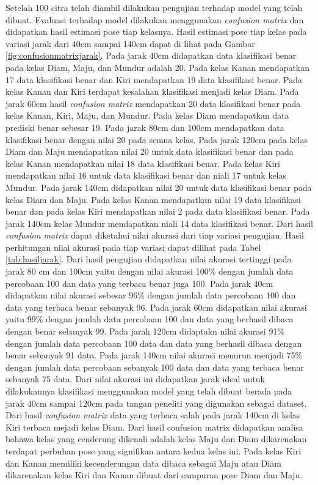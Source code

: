 Setelah 100 citra telah diambil dilakukan pengujian terhadap model yang telah dibuat. Evaluasi terhadap model dilakukan menggunakan \emph{confusion matrix} dan didapatkan hasil estimasi pose tiap kelasnya. Hasil estimasi pose tiap kelas pada variasi jarak dari 40cm sampai 140cm dapat di lihat pada Gambar \ref{fig:confusionmatrixjarak}. Pada jarak 40cm didapatkan data klasifikasi benar pada kelas Diam, Maju, dan Mundur adalah 20. Pada kelas Kanan mendapatkan 17 data klasifikasi benar dan Kiri mendapatkan 19 data klasifikasi benar. Pada kelas Kanan dan Kiri terdapat kesalahan klasifikasi menjadi kelas Diam. Pada jarak 60cm hasil \emph{confusion matrix} mendapatkan 20 data klasifikasi benar pada kelas Kanan, Kiri, Maju, dan Mundur. Pada kelas Diam mendapatkan data prediski benar sebesar 19. Pada jarak 80cm dan 100cm mendapatkan data klasifikasi benar dengan nilai 20 pada semua kelas. Pada jarak 120cm pada kelas Diam dan Maju mendapatkan nilai 20 untuk data klasifikasi benar dan pada kelas Kanan mendapatkan nilai 18 data klasifikasi benar. Pada kelas Kiri mendapatkan nilai 16 untuk data klasifikasi benar dan niali 17 untuk kelas Mundur. Pada jarak 140cm didapatkan nilai 20 untuk data klasifikasi benar pada kelas Diam dan Maju. Pada kelas Kanan mendapatkan nilai 19 data klasifikasi benar dan pada kelas Kiri mendapatkan nilai 2 pada data klasifikasi benar. Pada jarak 140cm kelas Mundur mendapatkan niali 14 data klasifikasi benar. Dari hasil \emph{confusion matrix} dapat diketahui nilai akurasi dari tiap variasi pengujian. Hasil perhitungan nilai akurasi pada tiap variasi dapat dilihat pada Tabel \ref{tab:hasiljarak}. Dari hasil pengujian didapatkan nilai akurasi tertinggi pada jarak 80 cm dan 100cm yaitu dengan nilai akurasi 100\% dengan jumlah data percobaan 100 dan data yang terbaca benar juga 100. Pada jarak 40cm didapatkan nilai akurasi sebesar 96\% dengan jumlah data percobaan 100 dan data yang terbaca benar sebanyak 96. Pada jarak 60cm didapatkan nilai akurasi yaitu 99\% dengan jumlah data percobaan 100 dan data yang berhasil dibaca dengan benar sebanyak 99. Pada jarak 120cm didaptakn nilai akurasi 91\% dengan jumlah data percobaan 100 data dan data yang berhasil dibaca dengan benar sebanyak 91 data. Pada jarak 140cm nilai akurasi menurun menjadi 75\% dengan jumlah data percobaan sebanyak 100 data dan data yang terbaca benar sebanyak 75 data. Dari nilai akurasi ini didapatkan jarak ideal untuk dilakukannya klasifikasi menggunakan model yang telah dibuat berada pada jarak 40cm sampai 120cm pada tangan peneliti yang digunakan sebagai dataset. Dari hasil \emph{confusion matrix} data yang terbaca salah pada jarak 140cm di kelas Kiri terbaca mejadi kelas Diam. Dari hasil confusion matrix didapatkan analisa bahawa kelas yang cenderung dikenali adalah kelas Maju dan Diam dikarenakan terdapat perbuhan pose yang signifikan antara kedua kelas ini. Pada kelas Kiri dan Kanan memiliki kecenderungan data dibaca sebagai Maju atau Diam dikarenakan kelas Kiri dan Kanan dibuat dari campuran pose Diam dan Maju.

